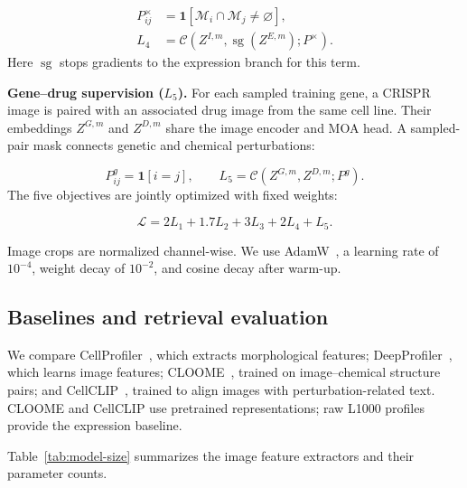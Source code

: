 \begin{equation}
\begin{aligned}
P^\times_{ij}&=\mathbf1[\mathcal M_i\cap\mathcal M_j\ne\varnothing],\\[3pt]
L_4&=\mathcal C(Z^{I,m},\operatorname{sg}(Z^{E,m});P^\times).
\end{aligned}
\label{eq:cross-moa}
\end{equation}
Here $\operatorname{sg}$ stops gradients to the expression branch for this term.

\textbf{Gene--drug supervision ($L_5$).}
For each sampled training gene, a CRISPR image is paired with an associated drug image from the same cell line. Their embeddings $Z^{G,m}$ and $Z^{D,m}$ share the image encoder and MOA head. A sampled-pair mask connects genetic and chemical perturbations:

\begin{equation}
P^g_{ij}=\mathbf1[i=j],
\qquad L_5=\mathcal C(Z^{G,m},Z^{D,m};P^g).
\label{eq:gene-drug}
\end{equation}
The five objectives are jointly optimized with fixed weights:

\begin{equation}
\mathcal L=2L_1+1.7L_2+3L_3+2L_4+L_5.
\label{eq:five-losses}
\end{equation}

Image crops are normalized channel-wise. We use AdamW~\cite{loshchilov2019}, a learning rate of $10^{-4}$, weight decay of $10^{-2}$, and cosine decay after warm-up.
\endgroup

\subsection{Baselines and retrieval evaluation}
We compare CellProfiler~\cite{stirling2021}, which extracts morphological features; DeepProfiler~\cite{moshkov2024}, which learns image features; CLOOME~\cite{sanchez2023}, trained on image--chemical structure pairs; and CellCLIP~\cite{lu2025}, trained to align images with perturbation-related text. CLOOME and CellCLIP use pretrained representations; raw L1000 profiles provide the expression baseline.

Table~\ref{tab:model-size} summarizes the image feature extractors and their parameter counts.


